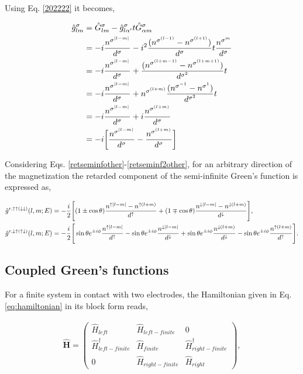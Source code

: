 \documentclass[10pt,prb,showpacs,amssymb,floatfix]{revtex4-1}
\newcommand{\dna}{\downarrow}
\newcommand{\nn}{\nonumber}
\newcommand{\upa}{\uparrow}
\newcommand{\alp}{\alpha}
\newcommand{\sg}{\sigma}
\newcommand{\h}{\hat}
\begin{document}
Using Eq. \eqref{202222} it becomes,

\begin{align}
\h g^\sg_{lm} &= \h G^\sg_{lm} -  \h g^\sg_{l\alp'}t\h G^\sg_{\alp m} \nn\\
&= -i \frac{n^{\sg^{|l-m|}}}{d^\sg} - i^2\frac{(n^{\sg^{(l-1)}} - n^{\sg^{(l+1)}})}{d^\sg}t\frac{n^{\sg^m}}{d^\sg} \nn\\
&=-i \frac{n^{\sg^{|l-m|}}}{d^\sg} + \frac{(n^{\sg^{(l+m-1)}} - n^{\sg^{(l+m+1)}})}{d^{\sg^2}}t \nn\\
&=-i \frac{n^{\sg^{|l-m|}}}{d^\sg} + n^{\sg^{(l+m)}}\frac{(n^{\sg^{-1}} - n^{\sg^{1}})}{d^{\sg^2}}t \nn\\
&=-i \frac{n^{\sg^{|l-m|}}}{d^\sg} + i\frac{n^{\sg^{(l+m)}}}{d^\sg} \nn\\
&=-i \bigg{[} \frac{n^{\sg^{|l-m|}}}{d^\sg} - \frac{n^{\sg^{(l+m)}}}{d^\sg} \bigg{]}
\end{align}


Considering Eqs. \eqref{retseminfother}-\eqref{retseminf2other}, for an arbitrary direction of the magnetization the retarded component of the semi-infinite Green's function is expressed as,


\begin{align}
\label{xx1}
\h g^{r,\upa\upa(\dna\dna)}(l,m;E)&= -\frac{i}{2}\Bigg{[}(1\pm\cos\theta)\frac{n^{\upa|l-m|}-n^{\upa(l+m)}}{d^\upa} + (1\mp\cos\theta)\frac{n^{\dna|l-m|}-n^{\dna(l+m)}}{d^\dna}\Bigg{]}, \\
\h g^{r,\dna\upa(\upa\dna)}(l,m;E)&= -\frac{i}{2}\Bigg{[}\sin\theta e^{\pm i\phi}\frac{n^{\upa|l-m|}}{d^\upa} - \sin\theta e^{\pm i\phi}\frac{n^{\dna |l-m|}}{d^\dna}+\sin\theta e^{\pm i\phi}\frac{n^{\dna(l+m)}}{d^\dna}-\sin\theta e^{\pm i\phi}\frac{n^{\upa(l+m)}}{d^\upa}\Bigg{]}.
\label{xx2}
\end{align}


\subsection{Coupled Green's functions}
For a finite system in contact with two electrodes, the Hamiltonian given in Eq. \eqref{eq:hamiltonian} in its block form reads,

\begin{align}
\bm{\h H} = \left(\begin{matrix}
\h H_{left} & \h H_{left-finite} & 0 \\
\h H^\dagger_{left-finite} & \hat H_{finite} & \h H_{right-finite}^\dagger \\
0 & \h H_{right-finite} & \h H_{right} 
\end{matrix} \right),
\label{blockh}
\end{align}
\end{document}
